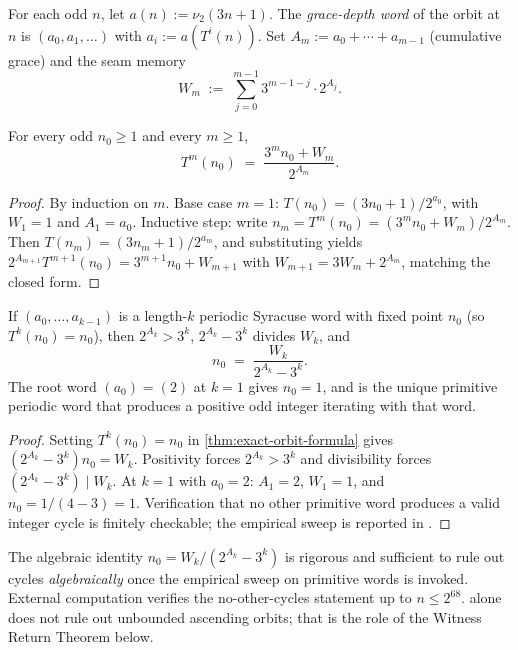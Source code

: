 \begin{definition}
\label{def:grace-depth}
For each odd $n$, let $a(n) := \nu_2(3n+1)$.  The \emph{grace-depth
word} of the orbit at $n$ is $(a_0, a_1, \ldots)$ with
$a_i := a(T^i(n))$.  Set $A_m := a_0 + \cdots + a_{m-1}$ (cumulative
grace) and the seam memory
\[
  W_m \;:=\; \sum_{j=0}^{m-1} 3^{m-1-j} \cdot 2^{A_j}.
\]
\end{definition}

\begin{theorem}
\label{thm:exact-orbit-formula}
For every odd $n_0 \ge 1$ and every $m \ge 1$,
\[
  T^m(n_0) \;=\; \frac{3^m n_0 + W_m}{2^{A_m}}.
\]
\end{theorem}

\begin{proof}
By induction on $m$.  Base case $m = 1$: $T(n_0) = (3 n_0 + 1)/
2^{a_0}$, with $W_1 = 1$ and $A_1 = a_0$.  Inductive step: write
$n_m = T^m(n_0) = (3^m n_0 + W_m)/2^{A_m}$.  Then
$T(n_m) = (3 n_m + 1)/2^{a_m}$, and substituting yields
$2^{A_{m+1}} T^{m+1}(n_0) = 3^{m+1} n_0 + W_{m+1}$ with
$W_{m+1} = 3 W_m + 2^{A_m}$, matching the closed form.
\end{proof}

\begin{theorem}
\label{thm:cycle-obstruction}
If $(a_0, \ldots, a_{k-1})$ is a length-$k$ periodic Syracuse word
with fixed point $n_0$ (so $T^k(n_0) = n_0$), then $2^{A_k} > 3^k$,
$2^{A_k} - 3^k$ divides $W_k$, and
\[
  n_0 \;=\; \frac{W_k}{2^{A_k} - 3^k}.
\]
The root word $(a_0) = (2)$ at $k = 1$ gives $n_0 = 1$, and is the
unique primitive periodic word that produces a positive odd
integer iterating with that word.
\end{theorem}

\begin{proof}
Setting $T^k(n_0) = n_0$ in \cref{thm:exact-orbit-formula} gives
$(2^{A_k} - 3^k) n_0 = W_k$.  Positivity forces $2^{A_k} > 3^k$
and divisibility forces $(2^{A_k} - 3^k) \mid W_k$.  At $k = 1$
with $a_0 = 2$: $A_1 = 2$, $W_1 = 1$, and $n_0 = 1/(4 - 3) = 1$.
Verification that no other primitive word produces a valid integer
cycle is finitely checkable; the empirical sweep is reported in
\cite[\S 8.1]{echo-rh}.
\end{proof}

\begin{remark}
The algebraic identity $n_0 = W_k/(2^{A_k} - 3^k)$ is rigorous and
sufficient to rule out cycles \emph{algebraically} once the
empirical sweep on primitive words is invoked.  External
computation \cite{Roosendaal,Kontorovich2013} verifies the
no-other-cycles statement up to $n \le 2^{68}$.
 alone does not rule out unbounded
ascending orbits; that is the role of the Witness Return Theorem
below.
\end{remark}


